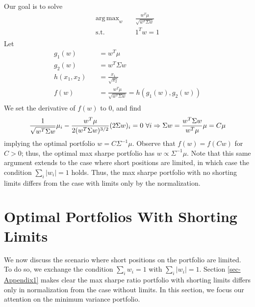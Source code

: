 \documentclass[10pt,twoside,titlepage]{article}   %
\DeclareMathOperator*{\argmax}{arg\,max}
\begin{document}
Our goal is to solve
\begin{equation*}
\begin{aligned}
\argmax_{w} \quad & \frac{w^T \mu}{ \sqrt{ w^T \Sigma w } } \\
\textrm{s.t.} \quad & 1^T w = 1\\
\end{aligned}
\end{equation*}
Let
\begin{equation*}
\begin{aligned}
g_1( w ) \quad & = w^T \mu \\
g_2( w ) \quad & = w^T \Sigma w \\
h( x_1 , x_2 ) \quad & = \frac{x_1}{ \sqrt{ x_2 } } \\
f( w ) \quad & = \frac{ w^T\mu}{ \sqrt{ w^T \Sigma w } } = h( g_1(w),g_2(w)) \\
\end{aligned}
\end{equation*}
We set the derivative of $f(w)$ to $0$, and find
\begin{equation*}
\frac{1}{\sqrt{w^T \Sigma w}} \mu_i - \frac{ w^T \mu }{ 2(w^T \Sigma w)^{3/2} } ( 2\Sigma w)_i = 0 \textrm{ } \forall i \Rightarrow \Sigma w = \frac{ w^T \Sigma w }{ w^T \mu } \mu = C \mu \\
\end{equation*}
implying the optimal portfolio $w = C\Sigma^{-1}\mu$. 
Observe that $f(w)=f(Cw)$ for $C>0$; thus, the optimal max sharpe portfolio has $w \propto \Sigma^{-1}\mu$. 
Note that this same argument extends to the case where short positions are limited, 
in which case the condition $\sum_i |w_i| = 1$ holds. 
Thus, the max sharpe portfolio with no shorting limits differs from the case with limits only by the normalization.

\section{Optimal Portfolios With Shorting Limits}\label{sec-Appendix2}
We now discuss the scenario where short positions on the portfolio are limited. 
To do so, we exchange the condition $\sum_i w_i = 1$ with $\sum_i |w_i| = 1$.
Section \ref{sec-Appendix1} makes clear the max sharpe ratio portfolio with shorting limits differs only in normalization from the case without limits. 
In this section, we focus our attention on the minimum variance portfolio.
\end{document}
